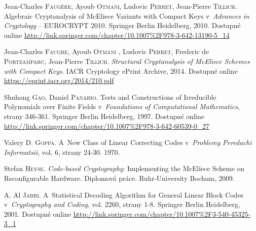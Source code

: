 \documentclass[thesis=M,czech,hidelinks]{FITthesis}[2012/06/26]
\newcommand{\0}{{\textcolor[gray]{0.75}{0}}}
\begin{document}
\begin{thebibliography}{99}
        Jean-Charles \textsc{Faugère}, Ayoub \textsc{Otmani}, Ludovic
        \textsc{Perret}, Jean-Pierre \textsc{Tillich}. Algebraic Cryptanalysis
        of McEliece Variants with Compact Keys v~\emph{Advances in Cryptology}
        -- EUROCRYPT 2010. Springer Berlin Heidelberg, 2010. Dostupné online
        \url{http://link.springer.com/chapter/10.1007\%2F978-3-642-13190-5\_14}

        Jean-Charles \textsc{Faugre}, Ayoub \textsc{Otmani} , Ludovic
        \textsc{Perret}, Frederic de \textsc{Portzamparc}, Jean-Pierre
        \textsc{Tillich}. \emph{Structural Cryptanalysis of McEliece Schemes
        with Compact Keys}. IACR Cryptology ePrint Archive, 2014. Dostupné
        online \url{https://eprint.iacr.org/2014/210.pdf}

%

        Shuhong \textsc{Gao}, Daniel \textsc{Panario}. Tests and Constructions
        of Irreducible Polynomials over Finite Fields v~\emph{Foundations of
        Computational Mathematics}, strany 346-361. Springer Berlin Heidelberg,
        1997. Dostupné online
        \url{http://link.springer.com/chapter/10.1007\%2F978-3-642-60539-0\_27}

        Valery D. \textsc{Goppa}. A~New Class of Linear Correcting Codes
        v~\emph{Problemy Peredachi Informatsii}, vol. 6, strany 24-30. 1970.

        Stefan \textsc{Heyse}. \emph{Code-based Cryptography}: Implementing the
        McEliece Scheme on Reconfigurable Hardware. Diplomová práce.
        Ruhr-University Bochum, 2009.

        A. Al \textsc{Jabri}. A~Statistical Decoding Algorithm for General
        Linear Block Codes v~\emph{Cryptography and Coding}, vol. 2260, strany
        1-8. Springer Berlin Heidelberg, 2001. Dostupné online
        \url{http://link.springer.com/chapter/10.1007\%2F3-540-45325-3\_1}


\end{thebibliography}
\end{document}
